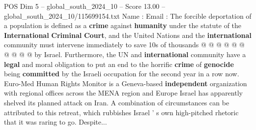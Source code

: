 \begin{textsample}{POS Dim 5 – global\_south\_2024\_10 – Score 13.00 – global\_south\_2024\_10/115699154.txt}
Name : Email : The forcible deportation of a population is defined as a \textbf{crime} against \textbf{humanity} under the statute of the \textbf{International} \textbf{Criminal} \textbf{Court}, and the United Nations and the \textbf{international} community must intervene immediately to save 10s of thousands @ @ @ @ @ @ @ @ @ @ by Israel.
Furthermore, the UN and \textbf{international} community have a \textbf{legal} and moral obligation to put an end to the horrific \textbf{crime} of \textbf{genocide} being \textbf{committed} by the Israeli occupation for the second year in a row now.
Euro-Med Human Rights Monitor is a Geneva-based \textbf{independent} organization with regional offices across the MENA region and Europe Israel has apparently shelved its planned attack on Iran.
A combination of circumstances can be attributed to this retreat, which rubbishes Israel ' s own high-pitched rhetoric that it was raring to go.
Despite...

\end{textsample}
